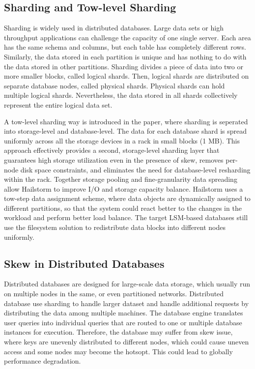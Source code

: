 \documentclass[a4paper,10pt,twoside]{article}
\begin{document}
\subsection{Sharding and Tow-level Sharding}
Sharding is widely used in distributed databases. Large data sets or high throughput applications can challenge the capacity of one single server.
Each area has the same schema and columns, but each table has completely different rows. 
Similarly, the data stored in each partition is unique and has nothing to do with the data stored in other partitions.
Sharding divides a piece of data into two or more smaller blocks, called logical shards.
Then, logical shards are distributed on separate database nodes, called physical shards.
Physical shards can hold multiple logical shards. 
Nevertheless, the data stored in all shards collectively represent the entire logical data set.
\par
A tow-level sharding way is introduced in the paper\cite{mainpaper}, where sharding is seperated into storage-level and database-level.
The data for each database shard is spread uniformly across all the storage devices in a rack in small blocks (1 MB).
This approach effectively provides a second, storage-level sharding layer that guarantees high storage utilization even in the presence of skew, removes per-node disk space constraints, and eliminates the need for database-level resharding within the rack. 
Together storage pooling and fine-granularity data spreading allow Hailstorm to improve I/O and storage capacity balance.
Hailstorm uses a tow-step data assignment scheme, where data objects are dynamically assigned to different partitions,  so that the system could react better to the changes in the workload and perform better load balance.
The target LSM-based databases still use the filesystem solution to redistribute data blocks into different nodes uniformly.


\subsection{Skew in Distributed Databases}

Distributed databases \cite{mongodb,tidb} are designed for large-scale data storage, which usually run on multiple nodes in the same,
or even partitioned networks.
Distributed database use sharding to handle larger dataset and handle additional requests by distributing the data among multiple machines.
The database engine translates user queries into individual queries that are routed to one or multiple database instances for execution.
Therefore, the database may suffer from skew issue, where keys are unevenly distributed to different nodes, which could cause uneven access and some nodes may become the hotsopt.
This could lead to globally performance degradation.
\end{document}
